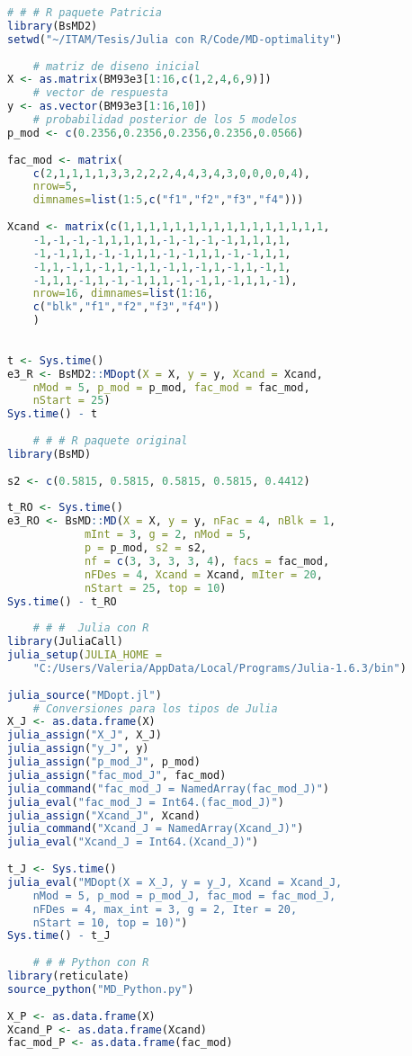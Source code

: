 \begin{lstlisting}[language=R]
	# # # R paquete Patricia
library(BsMD2)
setwd("~/ITAM/Tesis/Julia con R/Code/MD-optimality")
	
	# matriz de diseno inicial
X <- as.matrix(BM93e3[1:16,c(1,2,4,6,9)]) 
	# vector de respuesta
y <- as.vector(BM93e3[1:16,10]) 
	# probabilidad posterior de los 5 modelos
p_mod <- c(0.2356,0.2356,0.2356,0.2356,0.0566) 
	
fac_mod <- matrix(
	c(2,1,1,1,1,3,3,2,2,2,4,4,3,4,3,0,0,0,0,4),
	nrow=5,
	dimnames=list(1:5,c("f1","f2","f3","f4")))
	
Xcand <- matrix(c(1,1,1,1,1,1,1,1,1,1,1,1,1,1,1,1,
	-1,-1,-1,-1,1,1,1,1,-1,-1,-1,-1,1,1,1,1,
	-1,-1,1,1,-1,-1,1,1,-1,-1,1,1,-1,-1,1,1,
	-1,1,-1,1,-1,1,-1,1,-1,1,-1,1,-1,1,-1,1,
	-1,1,1,-1,1,-1,-1,1,1,-1,-1,1,-1,1,1,-1),
	nrow=16, dimnames=list(1:16,
	c("blk","f1","f2","f3","f4"))
	)
	
	
t <- Sys.time()
e3_R <- BsMD2::MDopt(X = X, y = y, Xcand = Xcand,
	nMod = 5, p_mod = p_mod, fac_mod = fac_mod, 
	nStart = 25)
Sys.time() - t
	
	# # # R paquete original
library(BsMD)
	
s2 <- c(0.5815, 0.5815, 0.5815, 0.5815, 0.4412)
	
t_RO <- Sys.time()
e3_RO <- BsMD::MD(X = X, y = y, nFac = 4, nBlk = 1, 
			mInt = 3, g = 2, nMod = 5, 
			p = p_mod, s2 = s2, 
			nf = c(3, 3, 3, 3, 4), facs = fac_mod, 
			nFDes = 4, Xcand = Xcand, mIter = 20, 
			nStart = 25, top = 10)
Sys.time() - t_RO
	
	# # #  Julia con R
library(JuliaCall)
julia_setup(JULIA_HOME = 
	"C:/Users/Valeria/AppData/Local/Programs/Julia-1.6.3/bin")
	
julia_source("MDopt.jl")
	# Conversiones para los tipos de Julia
X_J <- as.data.frame(X)
julia_assign("X_J", X_J)
julia_assign("y_J", y)
julia_assign("p_mod_J", p_mod)
julia_assign("fac_mod_J", fac_mod)
julia_command("fac_mod_J = NamedArray(fac_mod_J)")
julia_eval("fac_mod_J = Int64.(fac_mod_J)")
julia_assign("Xcand_J", Xcand)
julia_command("Xcand_J = NamedArray(Xcand_J)")
julia_eval("Xcand_J = Int64.(Xcand_J)")
	
t_J <- Sys.time()
julia_eval("MDopt(X = X_J, y = y_J, Xcand = Xcand_J, 
	nMod = 5, p_mod = p_mod_J, fac_mod = fac_mod_J, 
	nFDes = 4, max_int = 3, g = 2, Iter = 20, 
	nStart = 10, top = 10)")
Sys.time() - t_J
	
	# # # Python con R
library(reticulate)
source_python("MD_Python.py")
	
X_P <- as.data.frame(X)
Xcand_P <- as.data.frame(Xcand)
fac_mod_P <- as.data.frame(fac_mod)
	

\end{lstlisting}
